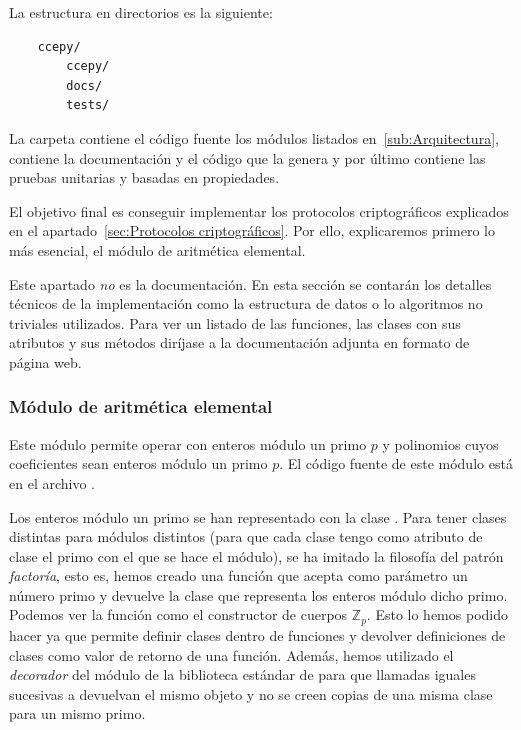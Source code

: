 La estructura en directorios es la siguiente:
\begin{verbatim}
    ccepy/
        ccepy/
        docs/
        tests/
\end{verbatim}
La carpeta  contiene el código fuente los módulos listados en~\ref{sub:Arquitectura},  contiene la documentación y el código que la genera y por último  contiene las pruebas unitarias y basadas en propiedades.

El objetivo final es conseguir implementar los protocolos criptográficos explicados en el apartado~\ref{sec:Protocolos criptográficos}. Por ello, explicaremos primero lo más esencial, el módulo de aritmética elemental.

\begin{nota}
    Este apartado \emph{no} es la documentación. En esta sección se contarán los detalles técnicos de la implementación como la estructura de datos o lo algoritmos no triviales utilizados. Para ver un listado de las funciones, las clases con sus atributos y sus métodos diríjase a la documentación adjunta en formato de página web.
\end{nota}

\subsubsection{Módulo de aritmética elemental}
\label{subs:Módulo de aritmética elemental}

Este módulo permite operar con enteros módulo un primo $p$ y polinomios cuyos coeficientes sean enteros módulo un primo $p$. El código fuente de este módulo está en el archivo .

Los enteros módulo un primo se han representado con la clase . Para tener clases distintas para módulos distintos (para que cada clase tengo como atributo de clase el primo con el que se hace el módulo), se ha imitado la filosofía del patrón \emph{factoría}, esto es, hemos creado una función  que acepta como parámetro un número primo y devuelve la clase que representa los enteros módulo dicho primo. Podemos ver la función  como el constructor de cuerpos $\mathbb{Z}_p$. Esto lo hemos podido hacer ya que  permite definir clases dentro de funciones y devolver definiciones de clases como valor de retorno de una función. Además, hemos utilizado el \emph{decorador}  del módulo  de la biblioteca estándar de  para que llamadas iguales sucesivas a  devuelvan el mismo objeto y no se creen copias de una misma clase para un mismo primo.

